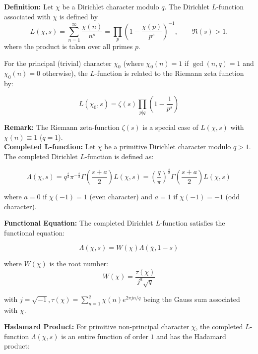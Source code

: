 \documentclass[12pt]{article}
\begin{document}
\textbf{Definition:}
Let $\chi$ be a Dirichlet character modulo $q$. The Dirichlet $L$-function associated with $\chi$ is defined by
\begin{equation}
L(\chi, s)
=
\sum_{n=1}^{\infty}\frac{\chi(n)}{n^s}
=
\prod_{p}
\left(1-\frac{\chi(p)}{p^s}\right)^{-1},
\qquad \Re(s)>1.
\end{equation}
where the product is taken over all primes $p$.

For the principal (trivial) character $\chi_0$ (where $\chi_0(n) = 1$ if $\gcd(n,q) = 1$ and $\chi_0(n) = 0$ otherwise), the $L$-function is related to the Riemann zeta function by:

\begin{equation}L(\chi_0, s) = \zeta(s) \prod_{p|q} \left(1 - \frac{1}{p^s}\right)\end{equation}

\textbf{Remark:} The Riemann zeta-function $\zeta(s)$ is a special case of $L(\chi, s)$ with $\chi(n) \equiv 1$ ($q = 1$).\\

\textbf{Completed L-function:}
Let $\chi$ be a primitive Dirichlet character modulo $q > 1$. The completed Dirichlet $L$-function is defined as:

\begin{equation} \Lambda(\chi, s) = q^{\frac{s}{2}}\pi^{-\frac{s}{2}} \Gamma\left(\frac{s+a}{2}\right) L( \chi, s) =\left(\frac{q}{\pi}\right)^{\frac{s}{2}} \Gamma\left(\frac{s+a}{2}\right) L( \chi, s) \end{equation}

where $ a = 0 $ if $ \chi(-1) = 1 $ (even character) and $ a = 1 $ if $ \chi(-1) = -1 $ (odd character).

\textbf{Functional Equation:}
The completed Dirichlet $L$-function satisfies the functional equation:

\begin{equation} \Lambda(\chi, s) = W(\chi) \Lambda(\overline{\chi}, 1-s) \end{equation}

where $ W(\chi) $ is the root number:
\begin{equation} W(\chi) = \frac{\tau(\chi)}{j^a \sqrt{q}} \end{equation}

with $j=\sqrt{-1}, \tau(\chi) = \sum_{n=1}^{q} \chi(n) e^{2\pi j n/q} $ being the Gauss sum associated with $ \chi $.

\textbf{Hadamard Product:}
For primitive non-principal character $\chi$, the completed $L$-function $\Lambda(\chi, s)$ is an entire function of order $1$ and has the Hadamard product:
\end{document}
